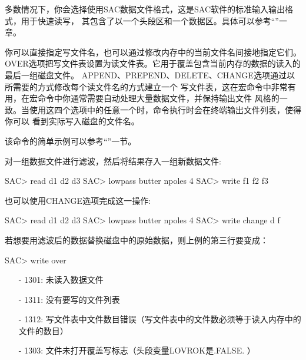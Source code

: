 多数情况下，你会选择使用SAC数据文件格式，这是SAC软件的标准输入输出格式，用于快速读写，
其包含了以一个头段区和一个数据区。具体可以参考``''一章。

你可以直接指定写文件名，也可以通过修改内存中的当前文件名间接地指定它们。
OVER选项把写文件表设置为读文件表。它用于覆盖包含当前内存的数据的读入的最后一组磁盘文件。
APPEND、PREPEND、DELETE、CHANGE选项通过以所需要的方式修改每个读文件名的方式建立一个
写文件表，这在宏命令中非常有用，在宏命令中你通常需要自动处理大量数据文件，并保持输出文件
风格的一致。当使用这四个选项中的任意一个时，命令执行时会在终端输出文件列表，使得你可以
看到实际写入磁盘的文件名。

该命令的简单示例可以参考``''一节。

对一组数据文件进行滤波，然后将结果存入一组新数据文件:
\begin{SACCode}
SAC> read d1 d2 d3
SAC> lowpass butter npoles 4
SAC> write f1 f2 f3
\end{SACCode}

也可以使用CHANGE选项完成这一操作:
\begin{SACCode}
SAC> read d1 d2 d3
SAC> lowpass butter npoles 4
SAC> write change d f
\end{SACCode}

若想要用滤波后的数据替换磁盘中的原始数据，则上例的第三行要变成：
\begin{SACCode}
SAC> write over
\end{SACCode}

\begin{itemize}
\item[-]1301: 未读入数据文件
\item[-]1311: 没有要写的文件列表
\item[-]1312: 写文件表中文件数目错误（写文件表中的文件数必须等于读入内存中的文件的数目）
\item[-]1303: 文件未打开覆盖写标志（头段变量LOVROK是.FALSE. ）
\end{itemize}

